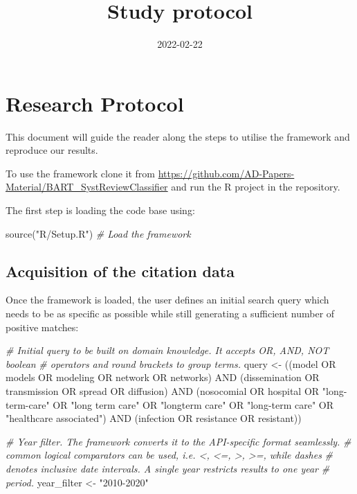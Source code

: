 \documentclass[
]{article}
\title{Study protocol}
\author{}
\date{\vspace{-2.5em}2022-02-22}
\newenvironment{Shaded}{\begin{snugshade}}{\end{snugshade}}
\newcommand{\CommentTok}[1]{\textcolor[rgb]{0.56,0.35,0.01}{\textit{#1}}}
\newcommand{\FunctionTok}[1]{\textcolor[rgb]{0.00,0.00,0.00}{#1}}
\newcommand{\NormalTok}[1]{#1}
\newcommand{\OtherTok}[1]{\textcolor[rgb]{0.56,0.35,0.01}{#1}}
\newcommand{\StringTok}[1]{\textcolor[rgb]{0.31,0.60,0.02}{#1}}
\begin{document}
\maketitle

{
\setcounter{tocdepth}{2}
\tableofcontents
}
\newpage

\hypertarget{research-protocol}{%
\section{Research Protocol}\label{research-protocol}}

This document will guide the reader along the steps to utilise the
framework and reproduce our results.

To use the framework clone it from
\url{https://github.com/AD-Papers-Material/BART_SystReviewClassifier}
and run the R project in the repository.

The first step is loading the code base using:

\begin{Shaded}
\begin{Highlighting}[]
\FunctionTok{source}\NormalTok{(}\StringTok{"R/Setup.R"}\NormalTok{) }\CommentTok{\# Load the framework}
\end{Highlighting}
\end{Shaded}

\hypertarget{acquisition-of-the-citation-data}{%
\subsection{Acquisition of the citation
data}\label{acquisition-of-the-citation-data}}

Once the framework is loaded, the user defines an initial search query
which needs to be as specific as possible while still generating a
sufficient number of positive matches:

\begin{Shaded}
\begin{Highlighting}[]
\CommentTok{\# Initial query to be built on domain knowledge. It accepts OR, AND, NOT boolean}
\CommentTok{\# operators and round brackets to group terms.}
\NormalTok{query }\OtherTok{\textless{}{-}} \StringTok{\textquotesingle{}((model OR models OR modeling OR network OR networks) AND}
\StringTok{(dissemination OR transmission OR spread OR diffusion) AND (nosocomial OR}
\StringTok{hospital OR "long{-}term{-}care" OR "long term care" OR "longterm care" OR}
\StringTok{"long{-}term care" OR "healthcare associated") AND (infection OR resistance OR}
\StringTok{resistant))\textquotesingle{}}

\CommentTok{\# Year filter. The framework converts it to the API{-}specific format seamlessly.}
\CommentTok{\# common logical comparators can be used, i.e. \textless{}, \textless{}=, \textgreater{}, \textgreater{}=, while dashes}
\CommentTok{\# denotes inclusive date intervals. A single year restricts results to one year}
\CommentTok{\# period.}
\NormalTok{year\_filter }\OtherTok{\textless{}{-}} \StringTok{"2010{-}2020"}
\end{Highlighting}
\end{Shaded}
\end{document}
